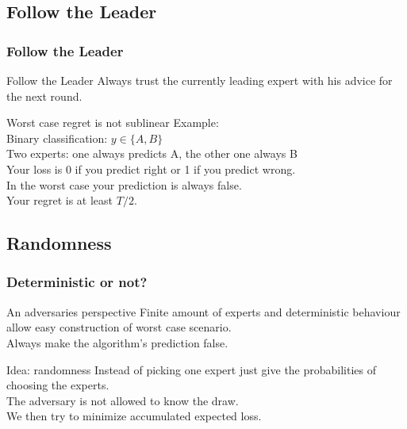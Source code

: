 \documentclass{beamer}
\begin{document}
\subsection{Follow the Leader}
\begin{frame}
	\frametitle{Follow the Leader}
	
	\begin{block}{Follow the Leader}
		Always trust the currently leading expert with his advice for the next round. 
	\end{block}
	
	\pause
	
	\begin{block}{Worst case regret is not sublinear}
		Example:\\
		Binary classification: $y \in \{A, B\}$\\
		Two experts: one always predicts A, the other one always B\\
		Your loss is 0 if you predict right or 1 if you predict wrong.\\ \pause
		\vspace{1em}
		In the worst case your prediction is always false.\\
		Your regret is at least $T/2$.
	\end{block}	
\end{frame}

\subsection{Randomness}
\begin{frame}
	\frametitle{Deterministic or not?}
	
	\begin{block}{An adversaries perspective}
		Finite amount of experts and deterministic behaviour allow easy construction of worst case scenario.\\
		Always make the algorithm's prediction false.
	\end{block}	
	 \pause
	\begin{block}{Idea: randomness}
		Instead of picking one expert just give the probabilities of choosing the experts.\\
		The adversary is not allowed to know the draw.\\
		We then try to minimize accumulated expected loss.
	\end{block}	
\end{frame}
\end{document}
